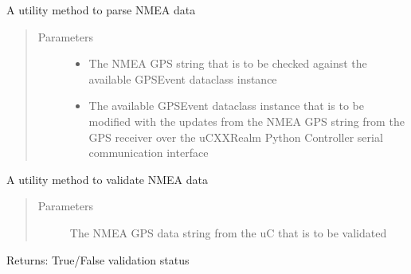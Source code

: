 \documentclass[letterpaper,10pt,english]{sphinxmanual}
\begin{document}
\begin{fulllineitems}
\label{\detokenize{Forge:Forge.nmea_parse}}
\sphinxAtStartPar
A utility method to parse NMEA data
\begin{quote}\begin{description}
\item[{Parameters}] \leavevmode\begin{itemize}
\item {} 
\sphinxAtStartPar
{} \textendash{} The NMEA GPS string that is to be checked against the available GPSEvent dataclass instance

\item {} 
\sphinxAtStartPar
{} \textendash{} The available GPSEvent dataclass instance that is to be modified with the updates from the NMEA GPS
string from the GPS receiver over the uC\sphinxhyphen{}XXRealm Python Controller serial communication interface

\end{itemize}

\end{description}\end{quote}

\end{fulllineitems}


\begin{fulllineitems}
\label{\detokenize{Forge:Forge.nmea_validate}}
\sphinxAtStartPar
A utility method to validate NMEA data
\begin{quote}\begin{description}
\item[{Parameters}] \leavevmode
\sphinxAtStartPar
{} \textendash{} The NMEA GPS data string from the uC that is to be validated

\end{description}\end{quote}

\sphinxAtStartPar
Returns: True/False validation status

\end{fulllineitems}
\end{document}
